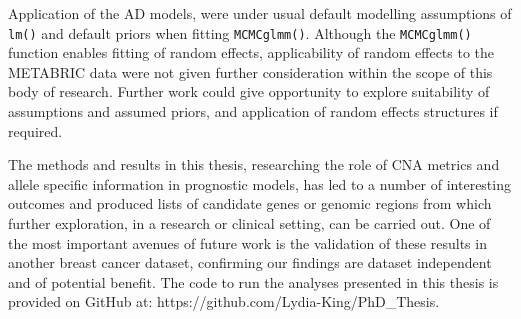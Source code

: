 Application of the AD models, were under usual default modelling assumptions of \texttt{lm()} and default priors when fitting \texttt{MCMCglmm()}. Although the \texttt{MCMCglmm()} function enables fitting of random effects, applicability of random effects to the METABRIC data were not given further consideration within the scope of this body of research. Further work could give opportunity to explore suitability of assumptions and assumed priors, and application of random effects structures if required. 

The methods and results in this thesis, researching the role of CNA metrics and allele specific information in prognostic models, has led to a number of interesting outcomes and produced lists of candidate genes or genomic regions from which further exploration, in a research or clinical setting, can be carried out. One of the most important avenues of future work is the validation of these results in another breast cancer dataset, confirming our findings are dataset independent and of potential benefit. The code to run the analyses presented in this thesis is provided on GitHub at: https://github.com/Lydia-King/PhD\_Thesis.